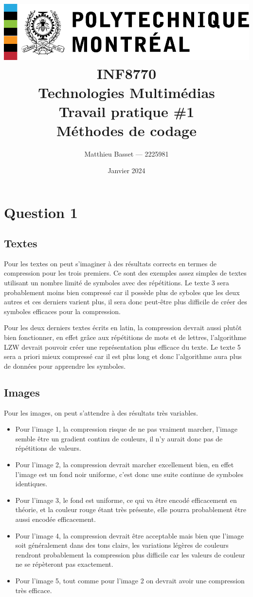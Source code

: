 \documentclass{article}[letterpaper, 11pt]
\title{
    \includegraphics[scale=0.8]{poly-logo.pdf}\\\vspace*{50pt}
    \huge\textbf{INF8770}\\
    \textbf{Technologies Multimédias}\\
    Travail pratique \#1\\
    Méthodes de codage\\
}
\author{\Large Matthieu Basset --- 2225981}
\date{\huge Janvier 2024}
\renewcommand{\thepage}{}
\begin{document}
\thispagestyle{empty}
\maketitle

\newpage

\renewcommand{\thepage}{\arabic{page}}
\pagestyle{fancy}
\renewcommand{\contentsname}{Table des matières}
\setcounter{page}{1}

\tableofcontents


\newpage

\section{Question 1}
\subsection{Textes}
Pour les textes on peut s'imaginer à des résultats corrects en termes de compression pour les trois premiers. Ce sont des exemples assez simples de textes utilisant un nombre limité de symboles avec des répétitions. Le texte 3 sera probablement moins bien compressé car il possède plus de syboles que les deux autres et ces derniers varient plus, il sera donc peut-être plus difficile de créer des symboles efficaces pour la compression.

Pour les deux derniers textes écrits en latin, la compression devrait aussi plutôt bien fonctionner, en effet grâce aux répétitions de mots et de lettres, l'algorithme LZW devrait pouvoir créer une représentation plus efficace du texte. Le texte 5 sera a priori mieux compressé car il est plus long et donc l'algorithme aura plus de données pour apprendre les symboles.
\subsection{Images}
Pour les images, on peut s'attendre à des résultats très variables.
\begin{itemize}[label={--}]
	\item Pour l'image 1, la compression risque de ne pas vraiment marcher, l'image semble être un gradient continu de couleurs, il n'y aurait donc pas de répétitions de valeurs.
	\item Pour l'image 2, la compression devrait marcher excellement bien, en effet l'image est un fond noir uniforme, c'est donc une suite continue de symboles identiques.
	\item Pour l'image 3, le fond est uniforme, ce qui va être encodé efficacement en théorie, et la couleur rouge étant très présente, elle pourra probablement être aussi encodée efficacement.
	\item Pour l'image 4, la compression devrait être acceptable mais bien que l'image soit généralement dans des tons clairs, les variations légères de couleurs rendront probablement la compression plus difficile car les valeurs de couleur ne se répèteront pas exactement.
	\item Pour l'image 5, tout comme pour l'image 2 on devrait avoir une compression très efficace.
\end{itemize}
\end{document}
